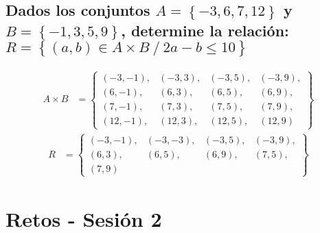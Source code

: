 \documentclass[10pt, a4paper]{article}
\begin{document}
\begin{multicols*}{2}
  \subsection{\small Dados los conjuntos $A=\left\{-3,6,7,12\right\}$ y $B=\left\{-1,3,5,9\right\}$, determine la relación: $R=\left\{\left(a,b\right)\in A \times B \ / \ 2a-b \leq 10\right\}$}
  \vspace{-0.2cm}
  \vspace{-0.2cm}
  \noindent\begin{align*}
    A \times B &= \left\{
    \begin{array}{cccc}
        \left(-3,-1\right), & \left(-3,3\right), & \left(-3,5\right), & \left(-3,9\right), \\
        \left(6,-1\right), & \left(6,3\right), & \left(6,5\right), & \left(6,9\right), \\
        \left(7,-1\right), & \left(7,3\right), & \left(7,5\right), & \left(7,9\right), \\
        \left(12,-1\right), & \left(12,3\right), & \left(12,5\right), & \left(12,9\right)
    \end{array}
    \right\}
    \end{align*}
    \vspace{-0.2cm}
  \begin{align*}
    R &= \left\{
    \begin{array}{llll}
        \left(-3,-1\right), & \left(-3,-3\right), & \left(-3,5\right), & \left(-3,9\right), \\
        \left(6,3\right), & \left(6,5\right), & \left(6,9\right), & \left(7,5\right), \\
        \left(7,9\right)
    \end{array}
    \right\}
\end{align*}
\vspace{-0.9cm}
\section{Retos - Sesión 2}
\vspace{-0.4cm}

\end{multicols*}
\end{document}
